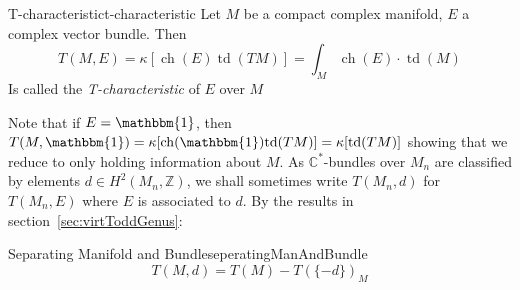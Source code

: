 \documentclass{ut-thesis}
\newcommand{\Z}{{\mathbb{Z}}}
\newcommand{\C}{{\mathbb{C}}}
\newcommand{\ch}{{\operatorname{ch}}}
\newcommand{\td}{{\operatorname{td}}}
\renewcommand{\ch}{{\operatorname{ch}}}
\begin{document}
\begin{defn}{T-characteristic}{t-characteristic}
  Let $M$ be a compact complex manifold, $E$ a complex vector bundle. Then
  \[
    T(M, E) = \kappa[\ch(E)\td(TM)] = \int_M \ch(E)\cdot \td(M)
  \]
  Is called the \emph{T-characteristic} of $E$ over $M$
\end{defn}
Note that if $E = \mathbbm{1}$, then $T(M,\mathbbm{1}) = \kappa[\ch(\mathbbm{1})\td(TM)] = \kappa[\td(TM)]$
showing that we reduce to only holding information about $M$.
As $\C^*$-bundles over $M_n$ are classified by elements $d \in H^2(M_n, \Z)$, we shall sometimes write $T(M_n,
d)$ for $T(M_n, E)$ where $E$ is associated to $d$. By the results in section~\ref{sec:virtToddGenus}:
\begin{prop}{Separating Manifold and Bundle}{seperatingManAndBundle}
  \[
  T(M, d) = T(M) - T(\{-d\})_M
\]
\end{prop}
\end{document}
